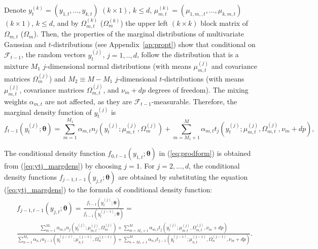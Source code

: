 \documentclass[nojss]{jss}
\begin{document}
\begin{appendix}
Denote $y_t^{(k)}=(y_{1,t},...,y_{k,t})$ $(k\times 1)$,  $k\leq d$,   $\mu_{m,t}^{(k)}=(\mu_{1,m,,t},...,\mu_{k,m,t})$ $(k\times 1)$,  $k\leq d$,  and by $\Omega_{m,t}^{(k)}$ ($\Omega_{m}^{(k)}$) the upper left $(k\times k)$ block matrix of $\Omega_{m,t}$ ($\Omega_{m}$).  Then,  the properties of the marginal distributions of multivariate Gaussian and $t$-distributions (see Appendix~\ref{ap:propt}) show that conditional on $\mathcal{F}_{t-1}$,  the random vectors $y_t^{(j)}$, $j=1,..,d$,  follow the distribution that is a mixture $M_1$ $j$-dimensional normal distributions (with means $\mu_{m,t}^{(j)}$ and covariance matrices $\Omega_{m}^{(j)}$) and $M_2\equiv M-M_1$ $j$-dimensional $t$-distributions (with means $\mu_{m,t}^{(j)}$,  covariance matrices $\Omega_{m,t}^{(j)}$, and $\nu_m + dp$ degrees of freedom).  The mixing weights $\alpha_{m,t}$ are not affected, as they are $\mathcal{F}_{t-1}$-measurable.  Therefore, the marginal density function of $y_t^{(j)}$ is
\begin{equation}\label{eq:ytj_margdens}
f_{t-1}(y_{t}^{(j)};\boldsymbol{\theta})=\sum_{m=1}^{M_1}\alpha_{m,t} n_j(y_{t}^{(j)};\mu_{m,t}^{(j)},\Omega_{m}^{(j)}) + \sum_{m=M_1 + 1}^{M}\alpha_{m,t} t_j(y_{t}^{(j)};\mu_{m,t}^{(j)},\Omega_{m,t}^{(j)},\nu_m + dp),
\end{equation}

The conditional density function $f_{0,t-1}(y_{1,t};\boldsymbol{\theta})$ in (\ref{eq:prodform}) is obtained from (\ref{eq:ytj_margdens}) by choosing $j=1$.  For $j=2,...,d$,  the conditional density functions  $f_{j-1,t-1}(y_{j,t};\boldsymbol{\theta})$ are obtained by substituting the equation (\ref{eq:ytj_margdens}) to the formula of conditional density function:
\begin{align}\label{eq:conddens_gstmvar}
\begin{aligned}
&f_{j-1,t-1}\left(y_{j,t};\boldsymbol{\theta}\right) = \frac{f_{t-1}(y_{t}^{(j)};\boldsymbol{\theta})}{f_{t-1}(y_{t}^{(j-1)};\boldsymbol{\theta})} = \\
&\frac{\sum_{m=1}^{M_1}\alpha_{m,t} n_j(y_{t}^{(j)};\mu_{m,t}^{(j)},\Omega_{m}^{(j)}) + \sum_{m=M_1+1}^{M}\alpha_{m,t} t_j(y_{t}^{(j)};\mu_{m,t}^{(j)},\Omega_{m,t}^{(j)}, \nu_m+dp)}{\sum_{n=1}^{M_1}\alpha_{n,t} n_{j-1}(y_{t}^{(j-1)};\mu_{n,t}^{(j-1)},\Omega_n^{(j-1)}) + \sum_{n=M_1+1}^{M}\alpha_{n,t} t_{j-1}(y_{t}^{(j-1)};\mu_{n,t}^{(j-1)},\Omega_n^{(j-1)},\nu_m + dp)}.
\end{aligned}
\end{align}


\end{appendix}
\end{document}
